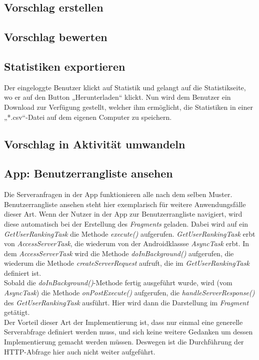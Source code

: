 \subsection{Vorschlag erstellen}
\subsection{Vorschlag bewerten}
\subsection{Statistiken exportieren}
Der eingeloggte Benutzer klickt auf Statistik und gelangt auf die Statistikseite, wo er auf den Button „Herunterladen“ klickt. Nun wird dem Benutzer ein Download zur Verfügung gestellt, welcher ihm ermöglicht, die Statistiken in einer „*.csv“-Datei auf dem eigenen Computer zu speichern.\\
\subsection{Vorschlag in Aktivität umwandeln}
\subsection{App: Benutzerrangliste ansehen}
Die Serveranfragen in der App funktionieren alle nach dem selben Muster. Benutzerrangliste ansehen steht hier exemplarisch für weitere Anwendungsfälle dieser Art.
Wenn der Nutzer in der App zur Benutzerrangliste navigiert, wird diese automatisch bei der Erstellung des \emph{Fragments} geladen. Dabei wird auf ein \emph{GetUserRankingTask} die Methode \emph{execute()} aufgerufen. \emph{GetUserRankingTask} erbt von \emph{AccessServerTask}, die wiederum von der Androidklassse \emph{AsyncTask} erbt. In dem \emph{AccessServerTask} wird die Methode \emph{doInBackground()} aufgerufen, die wiederum die Methode \emph{createServerRequest} aufruft, die im \emph{GetUserRankingTask} definiert ist.\\
Sobald die \emph{doInBackground()}-Methode fertig ausgeführt wurde, wird (vom \emph{AsyncTask}) die Methode \emph{onPostExecute()} aufgerufen, die \emph{handleServerResponse()} des \emph{GetUserRankingTask} ausführt. Hier wird dann die Darstellung im \emph{Fragment} getätigt.\\
Der Vorteil dieser Art der Implementierung ist, dass nur einmal eine generelle Serverabfrage definiert werden muss, und sich keine weitere Gedanken um dessen Implementierung gemacht werden m\"ussen. Deswegen ist die Durchführung der HTTP-Abfrage hier auch nicht weiter aufgeführt.